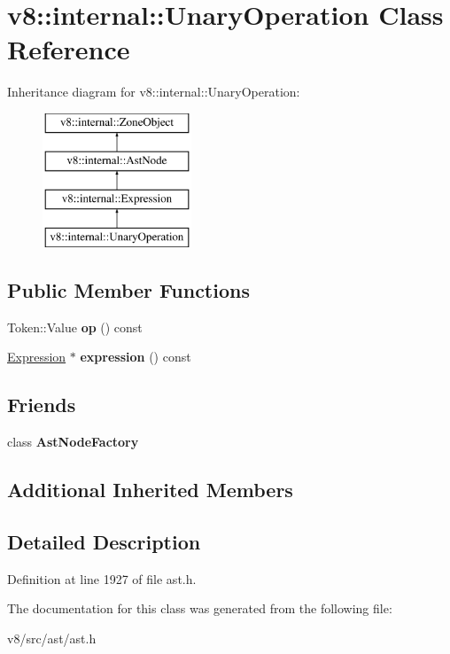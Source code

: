 \hypertarget{classv8_1_1internal_1_1UnaryOperation}{}\section{v8\+:\+:internal\+:\+:Unary\+Operation Class Reference}
\label{classv8_1_1internal_1_1UnaryOperation}
Inheritance diagram for v8\+:\+:internal\+:\+:Unary\+Operation\+:\begin{figure}[H]
\begin{center}
\leavevmode
\includegraphics[height=4.000000cm]{classv8_1_1internal_1_1UnaryOperation}
\end{center}
\end{figure}
\subsection*{Public Member Functions}
\begin{DoxyCompactItemize}
\item 
\mbox{\label{classv8_1_1internal_1_1UnaryOperation_ab06d7b109692ed87069ba335117045c6}} 
Token\+::\+Value {\bfseries op} () const
\item 
\mbox{\label{classv8_1_1internal_1_1UnaryOperation_a9cb9a4c9ec63fcb8c753e77f5a001d5f}} 
\mbox{\hyperlink{classv8_1_1internal_1_1Expression}{Expression}} $\ast$ {\bfseries expression} () const
\end{DoxyCompactItemize}
\subsection*{Friends}
\begin{DoxyCompactItemize}
\item 
\mbox{\label{classv8_1_1internal_1_1UnaryOperation_a8d587c8ad3515ff6433eb83c578e795f}} 
class {\bfseries Ast\+Node\+Factory}
\end{DoxyCompactItemize}
\subsection*{Additional Inherited Members}


\subsection{Detailed Description}


Definition at line 1927 of file ast.\+h.



The documentation for this class was generated from the following file\+:\begin{DoxyCompactItemize}
\item 
v8/src/ast/ast.\+h\end{DoxyCompactItemize}
